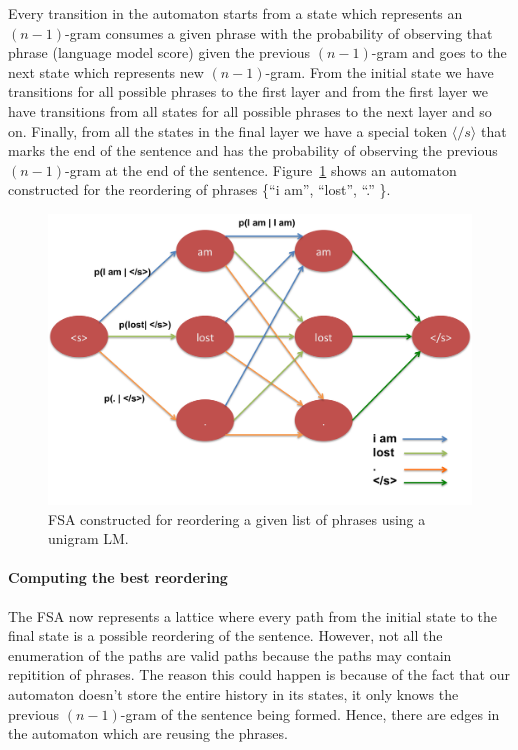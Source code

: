 \documentclass[11pt]{article}
\numberwithin{equation}{section}
\begin{document}
Every transition in the automaton starts from a state which represents an $(n-1)$-gram consumes a given phrase
with the probability of observing that phrase (language model score) given the previous $(n-1)$-gram and goes to the next state which 
represents new $(n-1)$-gram. From the initial state we have transitions for all possible phrases to the first layer
and from the first layer we have transitions from all states for all possible phrases to the next layer and so on.
Finally, from all the states in the final layer we have a special token $\langle/s\rangle$ that marks the end of the sentence
and has the probability of observing the previous $(n-1)$-gram at the end of the sentence. Figure~\ref{fig:reordering} shows an automaton constructed for the reordering of phrases \{``i am'', ``lost'', ``.'' \}.

\begin{figure}[t]
  \centering
  \includegraphics[width=1.5\columnwidth]{reordering.png}
  \caption{FSA constructed for reordering a given list of phrases using a unigram LM.}
  \label{fig:reordering}
\end{figure}

\paragraph{Computing the best reordering}
The FSA now represents a lattice where every path from the initial state to the final state is a possible reordering of
the sentence. However, not all the enumeration of the paths are valid paths because the paths may contain repitition of phrases.
The reason this could happen is because of the fact that our automaton doesn't store the entire history in its states, it only
knows the previous $(n-1)$-gram of the sentence being formed. Hence, there are edges in the automaton which are reusing the 
phrases.
\end{document}
